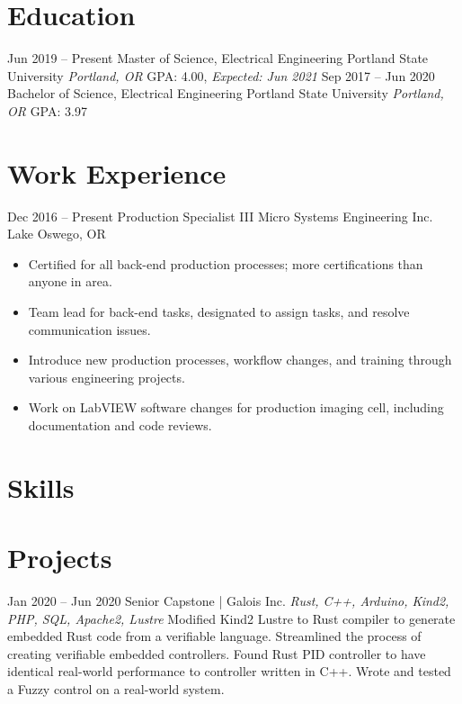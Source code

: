 \documentclass[letterpaper]{moderncv}        %
\begin{document}
\makecvtitle
\vspace*{-.8cm}
    
\section{Education}

\cventry
{Jun 2019 -- Present}
{Master of Science, Electrical Engineering}
{Portland State University}
{\textit{Portland, OR}}
{}
{GPA: 4.00, \textit{Expected: Jun 2021}}
{}
\cventry
{Sep 2017 -- Jun 2020}
{Bachelor of Science, Electrical Engineering}
{Portland State University}
{\textit{Portland, OR}}
{}
{GPA: 3.97}
{}

\section{Work Experience}
\cventry
{Dec 2016 -- Present}
{Production Specialist III}
{Micro Systems Engineering Inc.}
{Lake Oswego, OR}
{}
{\begin{itemize}%
		\item Certified for all back-end production processes; more certifications than anyone in area.
		\item Team lead for back-end tasks, designated to assign tasks, and resolve communication issues.
		\item Introduce new production processes, workflow changes, and training through various engineering projects.
		\item Work on LabVIEW software changes for production imaging cell, including documentation and code reviews.
	\end{itemize}}

\section{Skills}


\section{Projects}
\cventry
{Jan 2020 -- Jun 2020}
{Senior Capstone | Galois Inc.}
{}
{\textit{Rust, C++, Arduino, Kind2, PHP, SQL, Apache2, Lustre}}
{}
{Modified Kind2 Lustre to Rust compiler to generate embedded Rust code from a verifiable language.  Streamlined the process of creating verifiable embedded controllers.  Found Rust PID controller to have identical real-world performance to controller written in C++.  Wrote and tested a Fuzzy control on a real-world system.\\}
	
\end{document}
